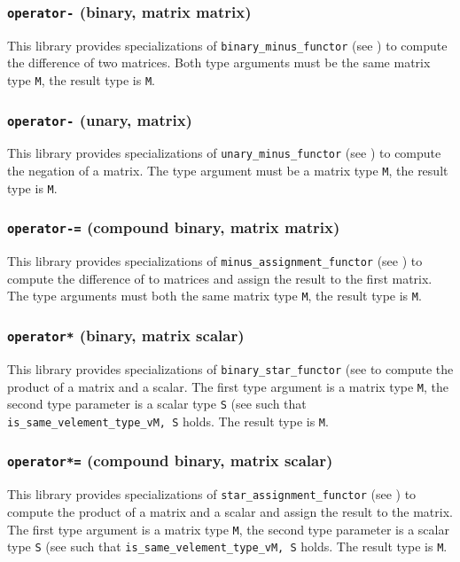 \documentclass[oneside]{book}
\begin{document}
\subsubsection{\texttt{operator-} (binary, matrix matrix)}
This library provides specializations of
\texttt{binary\_minus\_functor}
(see \cite{arithmeticfunctors}) to compute the
difference
of two matrices. Both type arguments must be the same matrix type \texttt{M}, the result type is \texttt{M}.

\subsubsection{\texttt{operator-} (unary, matrix)}
This library provides specializations of
\texttt{unary\_minus\_functor}
(see \cite{arithmeticfunctors}) to compute
the negation
of a matrix.
The type argument must be a matrix type \texttt{M}, the result type is \texttt{M}.

\subsubsection{\texttt{operator-=} (compound binary, matrix matrix)}
This library provides specializations of
\texttt{minus\_assignment\_functor}
(see \cite{arithmeticfunctors}) to compute
the difference of to matrices and assign the result to the first matrix.
The type arguments must both the same matrix type \texttt{M}, the result type is \texttt{M}.

\subsubsection{\texttt{operator*} (binary, matrix scalar)}
This library provides specializations of
\texttt{binary\_star\_functor}
(see \cite{arithmeticfunctors} to compute the
product of a matrix and a scalar.
The first type argument is a matrix type \texttt{M}, the second type parameter is a scalar type \texttt{S} (see \cite{mathscalars}
such that \texttt{is\_same\_v\textlangle element\_type\_v\textlangle M\textrangle, S\textrangle} holds.
The result type is \texttt{M}.

\subsubsection{\texttt{operator*=} (compound binary, matrix scalar)}
This library provides specializations of
\texttt{star\_assignment\_functor}
(see \cite{arithmeticfunctors}) to compute the
product of a matrix and a scalar and assign the result to the matrix.
The first type argument is a matrix type \texttt{M}, the second type parameter is a scalar type \texttt{S} (see \cite{mathscalars}
such that \texttt{is\_same\_v\textlangle element\_type\_v\textlangle M\textrangle, S\textrangle} holds.
The result type is \texttt{M}.
\end{document}
